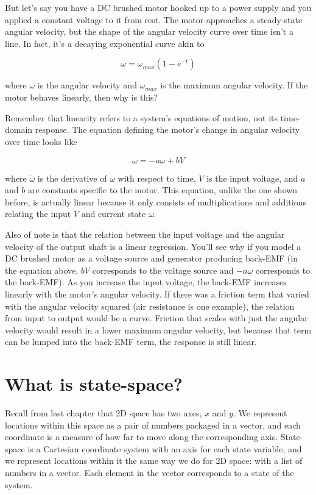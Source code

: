 But let's say you have a DC brushed motor hooked up to a power supply and you
applied a constant voltage to it from rest. The motor approaches a steady-state
angular velocity, but the shape of the angular velocity curve over time isn't a
line. In fact, it's a decaying exponential curve akin to

\begin{equation*}
  \omega = \omega_{max}\left(1 - e^{-t}\right)
\end{equation*}

where $\omega$ is the angular velocity and $\omega_{max}$ is the maximum angular
velocity. If the motor behaves linearly, then why is this?

Remember that linearity refers to a \gls{system}'s equations of motion, not its
time-domain response. The equation defining the motor's change in angular
velocity over time looks like

\begin{equation*}
  \dot{\omega} = -a\omega + bV
\end{equation*}

where $\dot{\omega}$ is the derivative of $\omega$ with respect to time, $V$ is
the input voltage, and $a$ and $b$ are constants specific to the motor. This
equation, unlike the one shown before, is actually linear because it only
consists of multiplications and additions relating the input $V$ and current
state $\omega$.

Also of note is that the relation between the input voltage and the angular
velocity of the output shaft is a linear regression. You'll see why if you model
a DC brushed motor as a voltage source and generator producing back-EMF (in the
equation above, $bV$ corresponds to the voltage source and $-a\omega$
corresponds to the back-EMF). As you increase the input voltage, the back-EMF
increases linearly with the motor's angular velocity. If there was a friction
term that varied with the angular velocity squared (air resistance is one
example), the relation from input to output would be a curve. Friction that
scales with just the angular velocity would result in a lower maximum angular
velocity, but because that term can be lumped into the back-EMF term, the
response is still linear.

\section{What is state-space?}

Recall from last chapter that 2D space has two axes, $x$ and $y$. We represent
locations within this space as a pair of numbers packaged in a vector, and each
coordinate is a measure of how far to move along the corresponding axis.
State-space is a Cartesian coordinate system with an axis for each \gls{state}
variable, and we represent locations within it the same way we do for 2D space:
with a list of numbers in a vector. Each element in the vector corresponds to a
\gls{state} of the \gls{system}.

